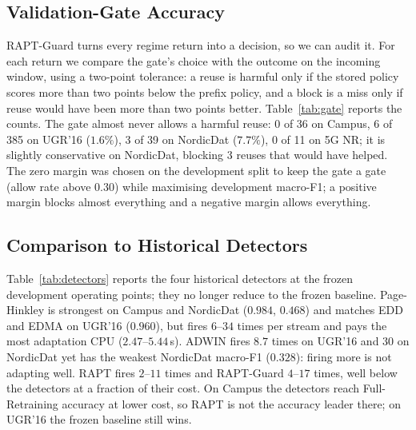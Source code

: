 \documentclass[conference]{IEEEtran}
\begin{document}
\subsection{Validation-Gate Accuracy}
\label{sec:guard}
RAPT-Guard turns every regime return into a decision, so we can audit it. For each return
we compare the gate's choice with the outcome on the incoming window, using a two-point
tolerance: a reuse is harmful only if the stored policy scores more than two points below
the prefix policy, and a block is a miss only if reuse would have been more than two
points better. Table~\ref{tab:gate} reports the counts. The gate almost never allows a
harmful reuse: 0 of 36 on Campus, 6 of 385 on UGR'16 ($1.6\%$), 3 of 39 on NordicDat
($7.7\%$), 0 of 11 on 5G NR; it is slightly conservative on NordicDat, blocking 3 reuses
that would have helped. The zero margin was chosen on the development split to keep the
gate a gate (allow rate above $0.30$) while maximising development macro-F1; a positive
margin blocks almost everything and a negative margin allows everything.




\subsection{Comparison to Historical Detectors}
\label{sec:detectors}
Table~\ref{tab:detectors} reports the four historical detectors at the frozen development
operating points; they no longer reduce to the frozen baseline. Page-Hinkley is strongest
on Campus and NordicDat ($0.984$, $0.468$) and matches EDD and EDMA on UGR'16 ($0.960$),
but fires $6$--$34$ times per stream and pays the most adaptation CPU ($2.47$--$5.44$\,s).
ADWIN fires $8.7$ times on UGR'16 and $30$ on NordicDat yet has the weakest NordicDat
macro-F1 ($0.328$): firing more is not adapting well. RAPT fires $2$--$11$ times and
RAPT-Guard $4$--$17$ times, well below the detectors at a fraction of their cost. On
Campus the detectors reach Full-Retraining accuracy at lower cost, so RAPT is not the
accuracy leader there; on UGR'16 the frozen baseline still wins.


\end{document}
